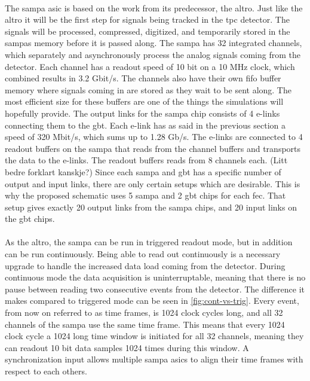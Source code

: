 \documentclass[a4paper, 12pt]{report}
\begin{document}
\paragraph{}
The \gls{sampa} \gls{asic} is based on the work from its predecessor, the \gls{altro}.
Just like the \gls{altro} it will be the first step for signals being tracked in the \gls{tpc} detector.
The signals will be processed, compressed, digitized, and temporarily stored in the \glspl{sampa} memory before it is passed along.
The \gls{sampa} has 32 integrated channels, which separately and asynchronously process the analog signals coming from the detector\cite{tdr-016}.
Each channel has a readout speed of 10 bit on a 10 MHz clock, which combined results in 3.2 Gbit/s.
The channels also have their own \gls{fifo} buffer memory where signals coming in are stored as they wait to be sent along.
The most efficient size for these buffers are one of the things the simulations will hopefully provide.
The output links for the \gls{sampa} chip consists of 4 e-links connecting them to the \gls{gbt}.
Each e-link has as said in the previous section a speed of 320 Mbit/s, which sums up to 1.28 Gb/s\cite{tdr-015}.
The e-links are connected to 4 readout buffers on the \gls{sampa} that reads from the channel buffers and transports the data to the e-links.
The readout buffers reads from 8 channels each. (Litt bedre forklart kanskje?)
Since each \gls{sampa} and \gls{gbt} has a specific number of output and input links, there are only certain setups which are desirable.
This is why the proposed schematic uses 5 \gls{sampa} and 2 \gls{gbt} chips for each \gls{fec}.
That setup gives exactly 20 output links from the \gls{sampa} chips, and 20 input links on the \gls{gbt} chips.

\paragraph{}
As the \gls{altro}, the \gls{sampa} can be run in triggered readout mode, but in addition can be run continuously.
Being able to read out continuously is a necessary upgrade to handle the increased data load coming from the detector.
During continuous mode the data acquisition is uninterruptable, meaning that there is no pause between reading two consecutive events from the detector.
The difference it makes compared to triggered mode can be seen in \ref{fig:cont-vs-trig}.
Every event, from now on referred to as time frames, is 1024 clock cycles long, and all 32 channels of the \gls{sampa} use the same time frame.
This means that every 1024 clock cycle a 1024 long time window is initiated for all 32 channels, meaning they can readout 10 bit data samples 1024 times during this window.
A synchronization input allows multiple \gls{sampa} \gls{asic}s to align their time frames with respect to each others.\cite{tdr-015}
\end{document}
